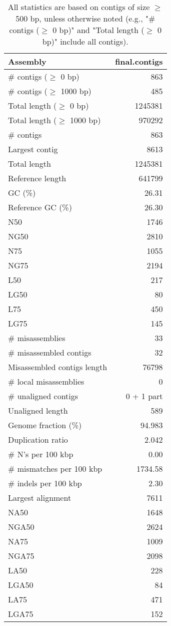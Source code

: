\documentclass[12pt,a4paper]{article}
\begin{document}
\begin{table}[ht]
\begin{center}
\caption{All statistics are based on contigs of size $\geq$ 500 bp, unless otherwise noted (e.g., "\# contigs ($\geq$ 0 bp)" and "Total length ($\geq$ 0 bp)" include all contigs).}
\begin{tabular}{|l*{1}{|r}|}
\hline
Assembly & final.contigs \\ \hline
\# contigs ($\geq$ 0 bp) & 863 \\ \hline
\# contigs ($\geq$ 1000 bp) & 485 \\ \hline
Total length ($\geq$ 0 bp) & 1245381 \\ \hline
Total length ($\geq$ 1000 bp) & 970292 \\ \hline
\# contigs & 863 \\ \hline
Largest contig & 8613 \\ \hline
Total length & 1245381 \\ \hline
Reference length & 641799 \\ \hline
GC (\%) & 26.31 \\ \hline
Reference GC (\%) & 26.30 \\ \hline
N50 & 1746 \\ \hline
NG50 & 2810 \\ \hline
N75 & 1055 \\ \hline
NG75 & 2194 \\ \hline
L50 & 217 \\ \hline
LG50 & 80 \\ \hline
L75 & 450 \\ \hline
LG75 & 145 \\ \hline
\# misassemblies & 33 \\ \hline
\# misassembled contigs & 32 \\ \hline
Misassembled contigs length & 76798 \\ \hline
\# local misassemblies & 0 \\ \hline
\# unaligned contigs & 0 + 1 part \\ \hline
Unaligned length & 589 \\ \hline
Genome fraction (\%) & 94.983 \\ \hline
Duplication ratio & 2.042 \\ \hline
\# N's per 100 kbp & 0.00 \\ \hline
\# mismatches per 100 kbp & 1734.58 \\ \hline
\# indels per 100 kbp & 2.30 \\ \hline
Largest alignment & 7611 \\ \hline
NA50 & 1648 \\ \hline
NGA50 & 2624 \\ \hline
NA75 & 1009 \\ \hline
NGA75 & 2098 \\ \hline
LA50 & 228 \\ \hline
LGA50 & 84 \\ \hline
LA75 & 471 \\ \hline
LGA75 & 152 \\ \hline
\end{tabular}
\end{center}
\end{table}
\end{document}

